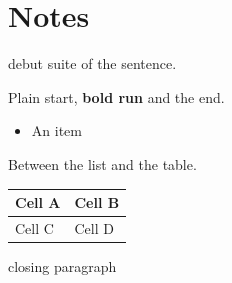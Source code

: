 \documentclass[11pt,a4paper]{article}
\begin{document}
\section{Notes}

debut suite of the sentence.

Plain start, \textbf{bold run} and the end.

\begin{itemize}
\item An item
\end{itemize}

Between the list and the table.

\begin{table}[h]
\begin{tabular}{|l|l|}
\hline
Cell A & Cell B \\ \hline
Cell C & Cell D \\ \hline
\end{tabular}
\end{table}

closing paragraph
\end{document}
